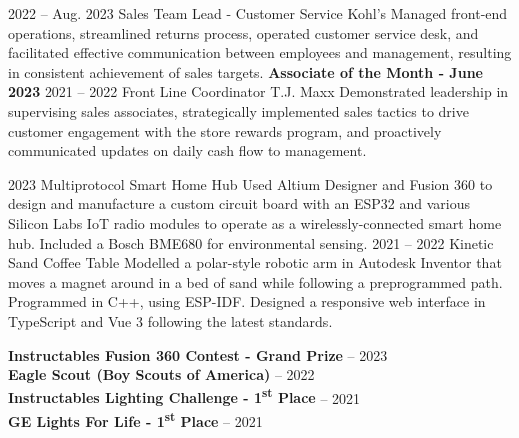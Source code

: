 \documentclass[9pt]{developercv} %
\begin{document}


\begin{entrylist}
	\entry
		{2022 -- Aug. 2023}
		{Sales Team Lead - Customer Service}
		{Kohl's}
		{Managed front-end operations, streamlined returns process, operated customer service desk, and facilitated effective communication between employees and management, resulting in consistent achievement of sales targets.  \textbf{Associate of the Month - June 2023} }
		\entry
		{2021 -- 2022}
		{Front Line Coordinator}
		{T.J. Maxx}
		{Demonstrated leadership in supervising sales associates, strategically implemented sales tactics to drive customer engagement with the store rewards program, and proactively communicated updates on daily cash flow to management.}
\end{entrylist}



\begin{entrylist}
	\entry
		{2023}
		{Multiprotocol Smart Home Hub}
		{}
		{Used Altium Designer and Fusion 360 to design and manufacture a custom circuit board with an ESP32 and various Silicon Labs IoT radio modules to operate as a wirelessly-connected smart home hub. Included a Bosch BME680 for environmental sensing.}
		\entry
		{2021 -- 2022}
		{Kinetic Sand Coffee Table}
		{}
		{Modelled a polar-style robotic arm in Autodesk Inventor that moves a magnet around in a bed of sand while following a preprogrammed path. Programmed in C++, using ESP-IDF. Designed a responsive web interface in TypeScript and Vue 3 following the latest standards.}
\end{entrylist}

\vspace{0.5cm}


\begin{minipage}[t]{1\textwidth}
	\vspace{-\baselineskip} %
	
	
	\textbf{Instructables Fusion 360 Contest - Grand Prize} -- 2023\\
	\textbf{Eagle Scout (Boy Scouts of America)} -- 2022\\
	\textbf{Instructables Lighting Challenge - 1\textsuperscript{st} Place} -- 2021\\
	\textbf{GE Lights For Life - 1\textsuperscript{st} Place} -- 2021\\
\end{minipage}

\vspace{\baselineskip}

\end{document}
